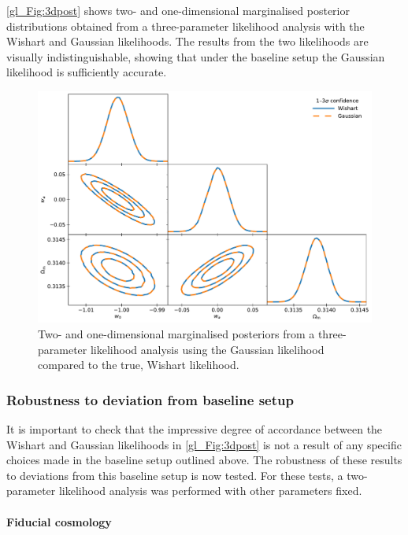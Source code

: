 \autoref{gl_Fig:3dpost} shows two- and one-dimensional marginalised posterior distributions obtained from a three-parameter likelihood analysis with the Wishart and Gaussian likelihoods. The results from the two likelihoods are visually indistinguishable, showing that under the baseline setup the Gaussian likelihood is sufficiently accurate.

\begin{figure}
\centering
\includegraphics[width=\textwidth]{3dpost}
\caption{Two- and one-dimensional marginalised posteriors from a three-parameter likelihood analysis using the Gaussian likelihood compared to the true, Wishart likelihood.}
\label{gl_Fig:3dpost}
\end{figure}

\subsubsection{Robustness to deviation from baseline setup}
\label{gl_Sec:robustness}

It is important to check that the impressive degree of accordance between the Wishart and Gaussian likelihoods in \autoref{gl_Fig:3dpost} is not a result of any specific choices made in the baseline setup outlined above. The robustness of these results to deviations from this baseline setup is now tested. For these tests, a two-parameter likelihood analysis was performed with other parameters fixed.

\paragraph*{Fiducial cosmology}

